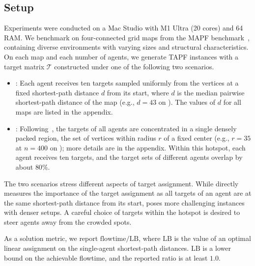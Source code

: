 \subsection{Setup}
\label{sec:setup}
Experiments were conducted on a Mac Studio with M1 Ultra (20 cores) and \SI{64}{\giga\byte} RAM.
We benchmark on four-connected grid maps from the MAPF benchmark~\cite{stern2019def}, containing diverse environments with varying sizes and structural characteristics.
On each map and each number of agents, we generate TAPF instances with a target matrix $\mathcal{T}$ constructed under one of the following two scenarios.
\begin{itemize}
    \item \scenEqdist: Each agent receives ten targets sampled uniformly from the vertices at a fixed shortest-path distance $d$ from its start, where $d$ is the median pairwise shortest-path distance of the map (e.g., $d=43$ on ).
    The values of $d$ for all maps are listed in the appendix.
    \item \scenHotspot: Following~\cite{kumagai2026alternating}, the targets of all agents are concentrated in a single densely packed region, the set of vertices within radius $r$ of a fixed center (e.g., $r = 35$ at $n = 400$ on ); more details are in the appendix.
    Within this hotspot, each agent receives ten targets, and the target sets of different agents overlap by about $80\%$.
\end{itemize}
The two scenarios stress different aspects of target assignment.
While \scenEqdist directly measures the importance of the target assignment as all targets of an agent are at the same shortest-path distance from its start, \scenHotspot poses more challenging instances with denser setups. 
A careful choice of targets within the hotspot is desired to steer agents away from the crowded spots.

As a solution metric, we report $\mathrm{flowtime} / \mathrm{LB}$, where $\mathrm{LB}$ is the value of an optimal linear assignment on the single-agent shortest-path distances.
$\mathrm{LB}$ is a lower bound on the achievable flowtime, and the reported ratio is at least $1.0$.

